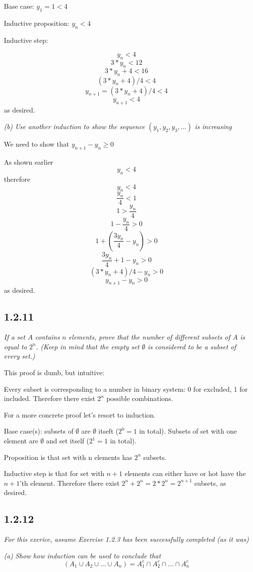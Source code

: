 \documentclass[11pt,oneside,titlepage]{book}
\begin{document}
Base case: $y_1 = 1 < 4$

Inductive proposition: $y_n < 4$

Inductive step:

$$y_n < 4$$
$$3 * y_n < 12$$
$$3 * y_n + 4 < 16$$
$$(3 * y_n + 4) / 4 < 4$$
$$y_{n + 1} =  (3 * y_n + 4) / 4 < 4$$
$$y_{n + 1} < 4$$
as desired.

\textit{(b) Use another induction to show the sequence $(y_1, y_2, y_3,...)$
  is increasing}

We need to show that $y_{n + 1} - y_n \geq 0$

As shown earlier 
$$y_n < 4$$
therefore
$$ y_n < 4$$
$$ \frac{y_n}{4} < 1$$
$$1 > \frac{y_n}{4}$$
$$1 - \frac{y_n}{4} > 0$$
$$1 + (\frac{3 y_n}{4} - y_n) > 0$$
$$\frac{3 y_n}{4} + 1 - y_n > 0$$
$$(3 * y_n + 4) / 4 - y_n  > 0$$
$$y_{n + 1} - y_n  > 0$$
as desired.

\subsection*{1.2.11}
\textit{If a set $A$ contains $n$ elements, prove that the number of
  different subsets of $A$ is equal to $2^n$. (Keep in mind that the empty set
  $\emptyset$ is considered to be a subset of every set.)}

This proof is dumb, but intuitive:

Every subset is corresponding to a number in binary system: 0 for excluded,
1 for included. Therefore there exist $2^n$ possible combinations.

For a more concrete proof let's resort to induction.

Base case(s): subsets of $\emptyset$ are
$\emptyset$ itseft ($2^0 = 1$ in total). Subsets of
set with one element are $\emptyset$ and set itself ($2^1 = 1$ in total).

Proposition is that set with n elements has $2^n$ subsets.

Inductive step is that for set with $n + 1$ elements can either have or hot
have the $n + 1$'th element. Therefore there exist $2^n + 2^n = 2 * 2^n =
2^{n + 1}$ subsets, as desired.

\subsection*{1.2.12}
\textit{For this exerice, assume Exercise 1.2.3 has been successfully completed
  (as it was)}

\textit{(a) Show how induction can be used to conclude that }
$$ (A_1 \cup A_2 \cup ... \cup A_n) = A^c_1 \cap A^c_2 \cap ... \cap A^c_n$$
\end{document}
